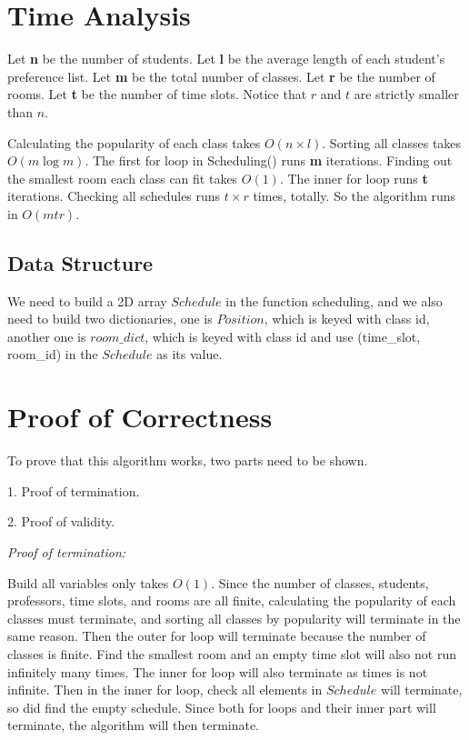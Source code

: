 \documentclass[11pt, oneside]{article}   	%
\begin{document}
\section{Time Analysis}
Let \textbf{n} be the number of students. 
Let \textbf{l} be the average length of each student's preference list.
Let \textbf{m} be the total number of classes. 
Let \textbf{r} be the number of rooms. 
Let \textbf{t} be the number of time slots. 
Notice that $r$ and $t$ are strictly smaller than $n$.

Calculating the popularity of each class takes $O(n \times l)$. Sorting all classes takes $O(m\log m)$. The first for loop in Scheduling() runs \textbf{m} iterations. Finding out the smallest room each class can fit takes $O(1)$. The inner for loop runs \textbf{t} iterations. Checking all schedules runs $t \times r$ times, totally. So the algorithm runs in $O(mtr)$.

\subsection{Data Structure}
We need to build a 2D array $Schedule$ in the function scheduling, and we also need to build two dictionaries, one is $Position$, which is keyed with class id, another one is $room\_dict$, which is keyed with class id and use (time\_slot, room\_id) in the $Schedule$ as its value. 


\section{Proof of Correctness}
To prove that this algorithm works, two parts need to be shown.

1. Proof of termination.

2. Proof of validity.

\textit{Proof of termination:}

Build all variables only takes $O(1)$. Since the number of classes, students, professors, time slots, and rooms are all finite, calculating the popularity of each classes must terminate, and sorting all classes by popularity will terminate in the same reason. Then the outer for loop will terminate because the number of classes is finite. Find the smallest room and an empty time slot will also not run infinitely many times. The inner for loop will also terminate as times is not infinite. Then in the inner for loop, check all elements in $Schedule$ will terminate, so did find the empty schedule. Since both for loops and their inner part will terminate, the algorithm will then terminate. \\
\end{document}
